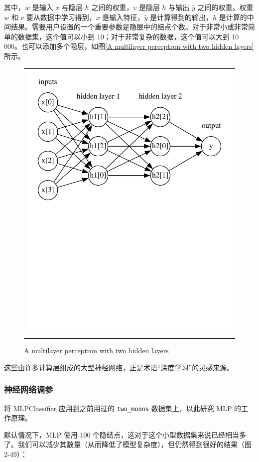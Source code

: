 其中，$w$ 是输入 $x$ 与隐层 $h$ 之间的权重，$v$ 是隐层 $h$ 与输出 $\hat{y}$ 之间的权重。权重 $w$ 和 $v$ 要从数据中学习得到，$x$ 是输入特征，$\hat{y}$ 是计算得到的输出，$h$ 是计算的中间结果。需要用户设置的一个重要参数是隐层中的结点个数。对于非常小或非常简单的数据集，这个值可以小到 10；对于非常复杂的数据，这个值可以大到 10 000。也可以添加多个隐层，如图\autoref{A multilayer perceptron with two hidden layers}所示。

\begin{figure}
    \centering
    \begin{tabular}{c}
        \includegraphics[page=1, width=.5\textwidth]{../Codes/Figures/A multilayer perceptron with two hidden layers.pdf} \\
    \end{tabular}
    \caption{A multilayer perceptron with two hidden layers}
    \label{A multilayer perceptron with two hidden layers}
\end{figure}

这些由许多计算层组成的大型神经网络，正是术语“深度学习”的灵感来源。

\subsubsection{神经网络调参}
将 MLPClassifier 应用到之前用过的 \verb|two_moons| 数据集上，以此研究 MLP 的工作原理。

默认情况下，MLP 使用 100 个隐结点，这对于这个小型数据集来说已经相当多了。我们可以减少其数量（从而降低了模型复杂度），但仍然得到很好的结果（图 2-49）：